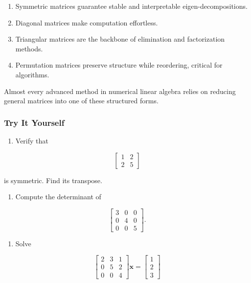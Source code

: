 \documentclass[
  letterpaper,
  DIV=11,
  numbers=noendperiod]{scrreprt}
\providecommand{\tightlist}{%
  \setlength{\itemsep}{0pt}\setlength{\parskip}{0pt}}
\begin{document}
\begin{enumerate}
\def\labelenumi{\arabic{enumi}.}
\tightlist
\item
  Symmetric matrices guarantee stable and interpretable
  eigen-decompositions.
\item
  Diagonal matrices make computation effortless.
\item
  Triangular matrices are the backbone of elimination and factorization
  methods.
\item
  Permutation matrices preserve structure while reordering, critical for
  algorithms.
\end{enumerate}

Almost every advanced method in numerical linear algebra relies on
reducing general matrices into one of these structured forms.

\subsubsection{Try It Yourself}\label{try-it-yourself-16}

\begin{enumerate}
\def\labelenumi{\arabic{enumi}.}
\tightlist
\item
  Verify that
\end{enumerate}

\[
\begin{bmatrix} 
1 & 2 \\ 
2 & 5 
\end{bmatrix}
\]

is symmetric. Find its transpose.

\begin{enumerate}
\def\labelenumi{\arabic{enumi}.}
\setcounter{enumi}{1}
\tightlist
\item
  Compute the determinant of
\end{enumerate}

\[
\begin{bmatrix} 
3 & 0 & 0 \\ 
0 & 4 & 0 \\ 
0 & 0 & 5 
\end{bmatrix}.
\]

\begin{enumerate}
\def\labelenumi{\arabic{enumi}.}
\setcounter{enumi}{2}
\tightlist
\item
  Solve
\end{enumerate}

\[
\begin{bmatrix} 
2 & 3 & 1 \\ 
0 & 5 & 2 \\ 
0 & 0 & 4 
\end{bmatrix}
\mathbf{x} =
\begin{bmatrix} 
1 \\ 
2 \\ 
3 
\end{bmatrix}
\]
\end{document}
